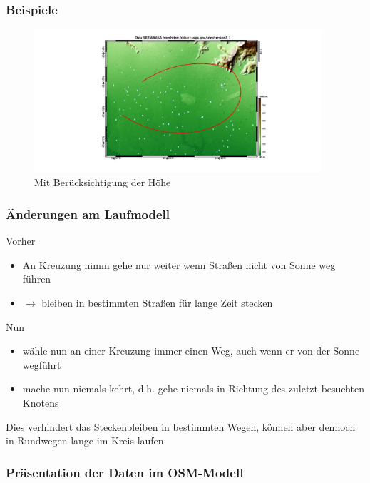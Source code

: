 \documentclass[aspectratio=43]{beamer}
\begin{document}
\begin{frame}
    \frametitle{Beispiele}
    \begin{figure}[t]
        \centering
        \includegraphics[width=0.95\textwidth]{bilder/nostreetele.jpg}
        \caption{Mit Berücksichtigung der Höhe}
    \end{figure}
\end{frame}

\begin{frame}
    \frametitle{Änderungen am Laufmodell}
    Vorher
    \begin{itemize}
        \item An Kreuzung nimm gehe nur weiter wenn Straßen nicht von Sonne weg führen
        \item[] $\rightarrow$ bleiben in bestimmten Straßen für lange Zeit stecken
    \end{itemize}
    Nun
    \begin{itemize}
        \item wähle nun an einer Kreuzung immer einen Weg, auch wenn er von der Sonne
            wegführt
        \item mache nun niemals kehrt, d.h. gehe niemals in Richtung des zuletzt besuchten
            Knotens
    \end{itemize}
    Dies verhindert das Steckenbleiben in bestimmten Wegen, können aber dennoch in
    Rundwegen lange im Kreis laufen
\end{frame}

\begin{frame}
    \frametitle{Präsentation der Daten im OSM-Modell}
\end{frame}
\end{document}

